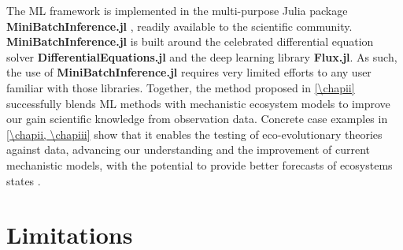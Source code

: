 The ML framework is implemented in the multi-purpose Julia package \textbf{MiniBatchInference.jl} \citep{MiniBatchInference}, readily available to the scientific community. \textbf{MiniBatchInference.jl} is built around the celebrated differential equation solver \textbf{DifferentialEquations.jl} and the deep learning library \textbf{Flux.jl}. As such, the use of \textbf{MiniBatchInference.jl} requires very limited efforts to any user familiar with those libraries.
% 
Together, the method proposed in \cref{\chapii} successfully blends ML methods with mechanistic ecosystem models to improve our gain scientific knowledge from observation data. Concrete case examples in \cref{\chapii, \chapiii} show that it enables the testing of eco-evolutionary theories against data, advancing our understanding and the improvement of current mechanistic models, with the potential to provide better forecasts of ecosystems states \citep{Urban2016}.

\section{Limitations}

